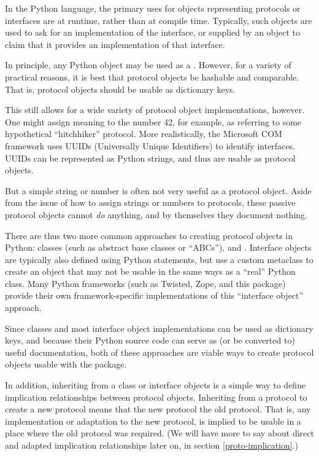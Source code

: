 \begin{verbatim%
}
\begin{verbatim%
}
In the Python language, the primary uses for objects representing protocols
or interfaces are at runtime, rather than at compile time.  Typically, such
objects are used to ask for an implementation of the interface, or supplied
by an object to claim that it provides an implementation of that interface.

In principle, any Python object may be used as a .
However, for a variety of practical reasons, it is best that protocol objects
be hashable and comparable.  That is, protocol objects should be usable as
dictionary keys.

This still allows for a wide variety of protocol object implementations,
however.  One might assign meaning to the number 42, for example, as
referring to some hypothetical ``hitchhiker'' protocol.  More realistically,
the Microsoft COM framework uses UUIDs (Universally Unique Identifiers) to
identify interfaces.  UUIDs can be represented as Python strings, and thus
are usable as protocol objects.





But a simple string or number is often not very useful as a protocol
object.  Aside from the issue of how to assign strings or numbers to
protocols, these passive protocol objects cannot \emph{do} anything, and by
themselves they document nothing.

There are thus two more common approaches to creating protocol objects in
Python: classes (such as abstract base classes or ``ABCs''), and .  Interface objects are typically also defined using Python
 statements, but use a custom metaclass to create an object
that may not be usable in the same ways as a ``real'' Python class.  Many
Python frameworks (such as Twisted, Zope, and this package) provide their own
framework-specific implementations of this ``interface object'' approach.

Since classes and most interface object implementations can be used as
dictionary keys, and because their Python source code can serve as (or
be converted to) useful documentation, both of these approaches are viable
ways to create protocol objects usable with the  package.

In addition, inheriting from a class or interface objects is a simple way to
define implication relationships between protocol objects.  Inheriting from a
protocol to create a new protocol means that the new protocol 
the old protocol.  That is, any implementation or adaptation to the new
protocol, is implied to be usable in a place where the old protocol was
required.  (We will have more to say about direct and adapted implication
relationships later on, in section \ref{proto-implication}.)


\end{verbatim%
}
\end{verbatim%
}
